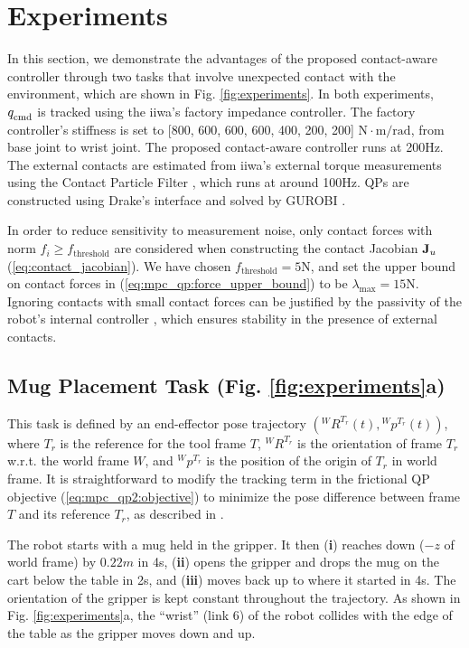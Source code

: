 \section{Experiments}
In this section, we demonstrate the advantages of the proposed contact-aware controller through two tasks that involve unexpected contact with the environment, which are shown in Fig. \ref{fig:experiments}. In both experiments, $q_{\text{cmd}}^{}$ is tracked using the iiwa's factory impedance controller. The factory controller's stiffness is set to [800, 600, 600, 600, 400, 200, 200] $\mathrm{N \cdot m/rad}$, from base joint to wrist joint. The proposed contact-aware controller runs at 200Hz. The external contacts are estimated from iiwa's external torque measurements using the Contact Particle Filter \cite{manuelli2016localizing}, which runs at around 100Hz. QPs are constructed using Drake's  interface \cite{drake} and solved by GUROBI \cite{gurobi}. 

In order to reduce sensitivity to measurement noise, only contact forces with norm $f_i \geq f_\text{threshold}$ are considered when constructing the contact Jacobian $\mathbf{J}_u$ (\ref{eq:contact_jacobian}). We have chosen $f_\text{threshold}=5\mathrm{N}$, and set the upper bound on contact forces in (\ref{eq:mpc_qp:force_upper_bound}) to be $\lambda_{\text{max}}=15\mathrm{N}$. Ignoring contacts with small contact forces can be justified by the passivity of the robot's internal controller \cite{albu2007unified}, which ensures stability in the presence of external contacts.

\subsection{Mug Placement Task (Fig. \ref{fig:experiments}a)}
This task is defined by an end-effector pose trajectory $\left({}^W R^{T_r} (t), {}^W p^{T_r}(t)\right)$, where $T_r$ is the reference for the tool frame $T$, ${}^W R^{T_r}$ is the orientation of frame $T_r$ w.r.t. the world frame $W$, and $ {}^W p^{T_r}$ is the position of the origin of $T_r$ in world frame. It is straightforward to modify the tracking term in the frictional QP objective (\ref{eq:mpc_qp2:objective}) to minimize the pose difference between frame $T$ and its reference $T_r$, as described in \cite{koolen2016design} \cite[Chapter 3]{tedrake2021manipulation}.

The robot starts with a mug held in the gripper. It then (\textbf{i}) reaches down ($-z$ of world frame) by $0.22m$ in 4s, (\textbf{ii}) opens the gripper and drops the mug on the cart below the table in 2s, and (\textbf{iii}) moves back up to where it started in 4s. The orientation of the gripper is kept constant throughout the trajectory. As shown in Fig. \ref{fig:experiments}a, the ``wrist'' (link 6) of the robot collides with the edge of the table as the gripper moves down and up.

